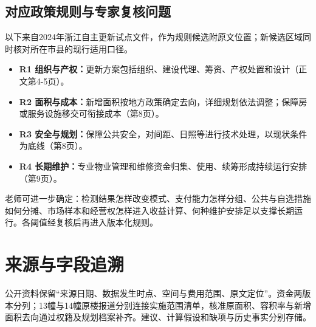 \documentclass[UTF8,11pt,fontset=windows]{ctexart}
\newcommand{\src}[1]{\cite{#1}}
\begin{document}
\subsection{对应政策规则与专家复核问题}
以下来自2024年浙江自主更新试点文件，作为规则候选附原文位置；新候选区域同时核对所在市县的现行适用口径。\src{S09}
\begin{itemize}
\item \textbf{R1 组织与产权：}更新方案包括组织、建设代理、筹资、产权处置和设计（正文第4-5页）。
\item \textbf{R2 面积与成本：}新增面积按地方政策确定去向，详细规划依法调整；保障房或服务设施移交可衔接成本（第8页）。
\item \textbf{R3 安全与规划：}保障公共安全，对间距、日照等进行技术处理，以现状条件为底线（第8页）。
\item \textbf{R4 长期维护：}专业物业管理和维修资金归集、使用、续筹形成持续运行安排（第9页）。
\end{itemize}
老师可进一步确定：检测结果怎样改变模式、支付能力怎样分组、公共与自选措施如何分摊、市场样本和经营权怎样进入收益计算、何种维护安排足以支撑长期运行。各阈值经复核后再进入版本化规则。

\newpage
\section{来源与字段追溯}
公开资料保留“来源日期、数据发生时点、空间与费用范围、原文定位”。资金两版本分列；13幢与14幢原楼报道分别连接实施范围清单，核准原面积、容积率与新增面积去向通过权籍及规划档案补齐。建议、计算假设和缺项与历史事实分别存储。
\end{document}
